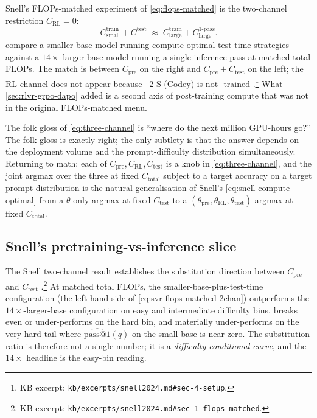 Snell's FLOPs-matched experiment of \cref{eq:flops-matched} is the
two-channel restriction $C_\text{RL} = 0$:
\begin{equation}
  C_\text{small}^\text{train} + C^\text{test}
    \;\approx\; C_\text{large}^\text{train} + C_\text{large}^\text{1-pass}.
  \label{eq:svr-flops-matched-2chan}
\end{equation}
\citet[\S 6]{snell2024} compare a smaller base model running
compute-optimal test-time strategies against a $14\times$ larger base
model running a single inference pass at matched total FLOPs. The
match is between $C_\text{pre}$ on the right and
$C_\text{pre} + C_\text{test}$ on the left; the RL channel does not
appear because ~2-S\* (Codey) is not -trained
\citep[\S 4]{snell2024}.\footnote{KB excerpt:
\nolinkurl{kb/excerpts/snell2024.md#sec-4-setup}.} What
\cref{sec:rlvr-grpo-dapo} added is a second axis of post-training
compute that was not in the original FLOPs-matched menu.

\begin{intuition}
The folk gloss of \cref{eq:three-channel} is ``where do the next
million GPU-hours go?'' The folk gloss is exactly right; the only
subtlety is that the answer depends on the deployment volume and the
prompt-difficulty distribution simultaneously. Returning to math: each
of $C_\text{pre}, C_\text{RL}, C_\text{test}$ is a knob in
\cref{eq:three-channel}, and the joint argmax over the three at fixed
$C_\text{total}$ subject to a target accuracy on a target prompt
distribution is the natural generalisation of Snell's
\cref{eq:snell-compute-optimal} from a $\theta$-only argmax at fixed
$C_\text{test}$ to a $(\theta_\text{pre}, \theta_\text{RL},
\theta_\text{test})$ argmax at fixed $C_\text{total}$.
\end{intuition}

\subsection{Snell's pretraining-vs-inference slice}
\label{sec:svr-pretraining-vs-inference}

The Snell two-channel result establishes the substitution direction
between $C_\text{pre}$ and $C_\text{test}$
\citep[\S 6]{snell2024}.\footnote{KB excerpt:
\nolinkurl{kb/excerpts/snell2024.md#sec-1-flops-matched}.} At matched
total FLOPs, the smaller-base-plus-test-time configuration (the
left-hand side of \cref{eq:svr-flops-matched-2chan}) outperforms the
$14\times$-larger-base configuration on easy and intermediate
difficulty bins, breaks even or under-performs on the hard bin, and
materially under-performs on the very-hard tail where
$\widehat{\mathrm{pass@}1}(q)$ on the small base is near zero. The
substitution ratio is therefore not a single number; it is a
\emph{difficulty-conditional curve}, and the $14\times$ headline is
the easy-bin reading.

